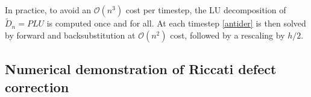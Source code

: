 \documentclass[10pt]{article}
\newcommand{\bigO}{{\mathcal O}}
\begin{document}
In practice, to avoid an $\bigO(n^3)$ cost per timestep,
the LU decomposition of $\tilde D_n = P L U$ is computed once and for all.
At each timestep \cref{antider} is then solved
by forward and backsubstitution at $\bigO(n^2)$ cost, followed by a rescaling by $h/2$.


\subsection{Numerical demonstration of Riccati defect correction}
\label{demo}
\end{document}

